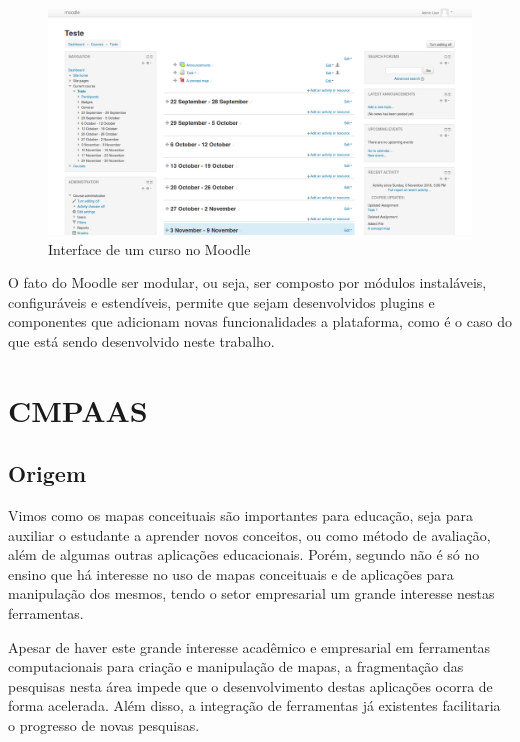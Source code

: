 \documentclass[
	12pt,				%
	openright,			%
	oneside,			%
	a4paper,			%
	english,			%
	french,				%
	spanish,			%
	brazil				%
	]{abntex2}
\begin{document}
\begin{figure}[htb]
	\caption{\label{fig_moodle}Interface de um curso no Moodle}
	\begin{center}
		\includegraphics[scale=0.2]{moodle.png}
	\end{center}
\end{figure}
O fato do Moodle ser modular, ou seja, ser composto por módulos instaláveis, configuráveis e estendíveis,  permite que sejam desenvolvidos plugins e componentes que adicionam novas funcionalidades a plataforma, como é o caso do que está sendo desenvolvido neste trabalho.




\chapter{CMPAAS}
\section{Origem}

Vimos como os mapas conceituais são importantes para educação, seja para auxiliar o estudante a aprender novos conceitos, ou como método de avaliação, além de algumas outras aplicações educacionais. Porém, segundo  não é só no ensino que há interesse no uso de mapas conceituais e de aplicações para manipulação dos mesmos, tendo o setor empresarial um grande interesse nestas ferramentas. 

Apesar de haver este grande interesse acadêmico e empresarial em ferramentas computacionais para criação e manipulação de mapas, a fragmentação das pesquisas nesta área impede que o desenvolvimento destas aplicações ocorra de forma acelerada. Além disso, a integração de ferramentas já existentes facilitaria o progresso de novas pesquisas.
\end{document}
